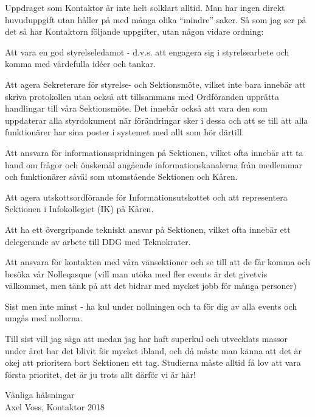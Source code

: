 \documentclass[10pt]{article}
\begin{document}
Uppdraget som Kontaktor är inte helt solklart alltid. Man har ingen direkt huvuduppgift utan håller på med många olika ``mindre'' saker. Så som jag ser på det så har Kontaktorn följande uppgifter, utan någon vidare ordning:
\begin{dashlist}
    \item Att vara en god styrelseledamot - d.v.s. att engagera sig i styrelsearbete och komma med värdefulla idéer och tankar.
    \item Att agera Sekreterare för styrelse- och Sektionsmöte, vilket inte bara innebär att skriva protokollen utan också att tillsammans med Ordföranden upprätta handlingar till våra Sektionsmöte. Det innebär också att vara den som uppdaterar alla styrdokument när förändringar sker i dessa och att se till att alla funktionärer har sina poster i systemet med allt som hör därtill.
    \item Att ansvara för informationsspridningen på Sektionen, vilket ofta innebär att ta hand om frågor och önskemål angående informationskanalerna från medlemmar och funktionärer såväl som utomstående Sektionen och Kåren.
    \item Att agera utskottsordförande för Informationsutskottet och att representera Sektionen i Infokollegiet (IK) på Kåren.
    \item Att ha ett övergripande tekniskt ansvar på Sektionen, vilket ofta innebär ett delegerande av arbete till DDG med Teknokrater.
    \item Att ansvara för kontakten med våra vänsektioner och se till att de får komma och besöka vår Nolleqasque (vill man utöka med fler events är det givetvis välkommet, men tänk på att det bidrar med mycket jobb för många personer)
    \item Sist men inte minst - ha kul under nollningen och ta för dig av alla events och umgås med nollorna.
\end{dashlist}

Till sist vill jag säga att medan jag har haft superkul och utvecklats massor under året har det blivit för mycket ibland, och då måste man känna att det är okej att prioritera bort Sektionen ett tag. Studierna måste alltid få lov att vara första prioritet, det är ju trots allt därför vi är här!

\begin{itshape}
Vänliga hälsningar\\
Axel Voss, Kontaktor 2018\\
\end{itshape}
\newpage
\end{document}
